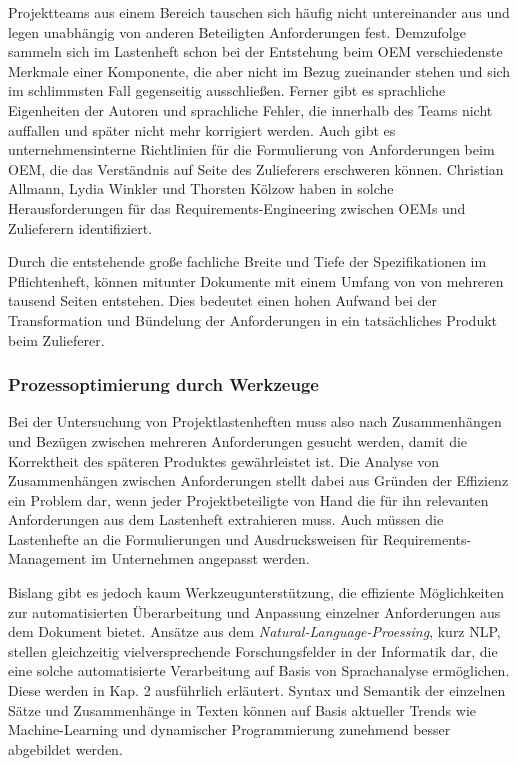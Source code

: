 \documentclass[12pt]{report}
\begin{document}
Projektteams aus einem Bereich tauschen sich häufig nicht untereinander aus und legen unabhängig von anderen Beteiligten Anforderungen fest. Demzufolge sammeln sich im Lastenheft schon bei der Entstehung beim OEM verschiedenste Merkmale einer Komponente, die aber nicht im Bezug zueinander stehen und sich im schlimmsten Fall gegenseitig ausschließen. Ferner gibt es sprachliche Eigenheiten der Autoren und sprachliche Fehler, die innerhalb des Teams nicht auffallen und später nicht mehr korrigiert werden. Auch gibt es unternehmensinterne Richtlinien für die Formulierung von Anforderungen beim OEM, die das Verständnis auf Seite des Zulieferers erschweren können. Christian Allmann, Lydia Winkler und Thorsten Kölzow haben in \cite{awk06} solche Herausforderungen für das Requirements-Engineering zwischen OEMs und Zulieferern identifiziert.

Durch die entstehende große fachliche Breite und Tiefe der Spezifikationen im Pflichtenheft, können mitunter Dokumente mit einem Umfang von von mehreren tausend Seiten entstehen. Dies bedeutet einen hohen Aufwand bei der Transformation und Bündelung der Anforderungen in ein tatsächliches Produkt beim Zulieferer. 

\subsubsection{Prozessoptimierung durch Werkzeuge}
Bei der Untersuchung von Projektlastenheften muss also nach Zusammenhängen und Bezügen zwischen mehreren Anforderungen gesucht werden, damit die Korrektheit des späteren Produktes gewährleistet ist. Die Analyse von Zusammenhängen zwischen Anforderungen stellt dabei aus Gründen der Effizienz ein Problem dar, wenn jeder Projektbeteiligte von Hand die für ihn relevanten Anforderungen aus dem Lastenheft extrahieren muss. Auch müssen die Lastenhefte an die Formulierungen und Ausdrucksweisen für Requirements-Management im Unternehmen angepasst werden. 

Bislang gibt es jedoch kaum Werkzeugunterstützung, die effiziente Möglichkeiten zur automatisierten Überarbeitung und Anpassung einzelner Anforderungen aus dem Dokument bietet. Ansätze aus dem \textit{Natural-Language-Proessing}, kurz NLP, stellen gleichzeitig vielversprechende Forschungsfelder in der Informatik dar, die eine solche automatisierte Verarbeitung auf Basis von Sprachanalyse ermöglichen. Diese werden in Kap. 2 ausführlich erläutert. Syntax und Semantik der einzelnen Sätze und Zusammenhänge in Texten können auf Basis aktueller Trends wie Machine-Learning und dynamischer Programmierung zunehmend besser abgebildet werden.
\end{document}
